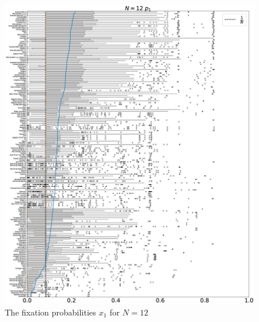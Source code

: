 \documentclass[10pt,letterpaper]{article}
\begin{document}
\begin{figure}[!hbtp]
    \centering
    \includegraphics[draft, width=\textwidth]{./Fig22.eps}
    \caption{The fixation probabilities \(x_1\) for \(N=12\)}
\end{figure}
\end{document}
